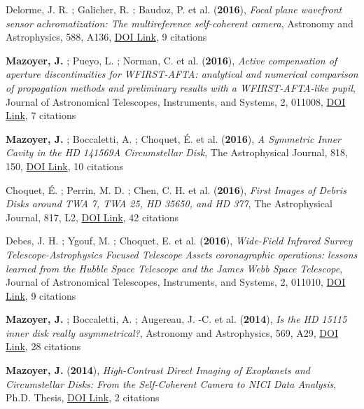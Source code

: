 \documentclass[11pt]{article}
\begin{document}
\begin{etaremune}
\item Delorme, J. R. ; Galicher, R. ; Baudoz, P. et al. ({\bf2016}), {\it Focal plane wavefront sensor achromatization: The multireference self-coherent camera}, Astronomy and Astrophysics, 588, A136, \href{https://doi.org/10.1051/0004-6361/201527657}{DOI Link}, 9 citations

\item {\bf Mazoyer, J.} ; Pueyo, L. ; Norman, C. et al. ({\bf2016}), {\it Active compensation of aperture discontinuities for WFIRST-AFTA: analytical and numerical comparison of propagation methods and preliminary results with a WFIRST-AFTA-like pupil}, Journal of Astronomical Telescopes, Instruments, and Systems, 2, 011008, \href{https://doi.org/10.1117/1.JATIS.2.1.011008}{DOI Link}, 7 citations

\item {\bf Mazoyer, J.} ; Boccaletti, A. ; Choquet, {\'E}. et al. ({\bf2016}), {\it A Symmetric Inner Cavity in the HD 141569A Circumstellar Disk}, The Astrophysical Journal, 818, 150, \href{https://doi.org/10.3847/0004-637X/818/2/150}{DOI Link}, 10 citations

\item Choquet, {\'E}. ; Perrin, M. D. ; Chen, C. H. et al. ({\bf2016}), {\it First Images of Debris Disks around TWA 7, TWA 25, HD 35650, and HD 377}, The Astrophysical Journal, 817, L2, \href{https://doi.org/10.3847/2041-8205/817/1/L2}{DOI Link}, 42 citations

\item Debes, J. H. ; Ygouf, M. ; Choquet, E. et al. ({\bf2016}), {\it Wide-Field Infrared Survey Telescope-Astrophysics Focused Telescope Assets coronagraphic operations: lessons learned from the Hubble Space Telescope and the James Webb Space Telescope}, Journal of Astronomical Telescopes, Instruments, and Systems, 2, 011010, \href{https://doi.org/10.1117/1.JATIS.2.1.011010}{DOI Link}, 9 citations

\item {\bf Mazoyer, J.} ; Boccaletti, A. ; Augereau, J. -C. et al. ({\bf2014}), {\it Is the HD 15115 inner disk really asymmetrical?}, Astronomy and Astrophysics, 569, A29, \href{https://doi.org/10.1051/0004-6361/201424479}{DOI Link}, 28 citations

\item {\bf Mazoyer, J.} ({\bf2014}), {\it High-Contrast Direct Imaging of Exoplanets and Circumstellar Disks: From the Self-Coherent Camera to NICI Data Analysis}, Ph.D. Thesis, \href{https://doi.org/10.5281/zenodo.58003}{DOI Link}, 2 citations


\end{etaremune}
\end{document}
